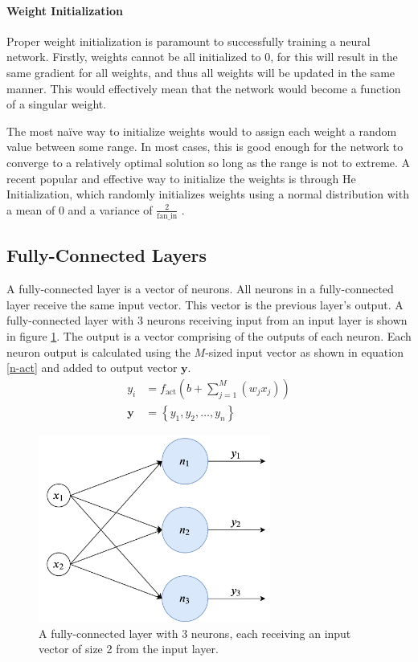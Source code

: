 \paragraph{Weight Initialization}
Proper weight initialization is paramount to successfully training a neural network. Firstly, weights cannot be all initialized to 0, for this will result in the same gradient for all weights, and thus all weights will be updated in the same manner. This would effectively mean that the network would become a function of a singular weight.

The most na\"ive way to initialize weights would to assign each weight a random value between some range. In most cases, this is good enough for the network to converge to a relatively optimal solution so long as the range is not to extreme. A recent popular and effective way to initialize the weights is through He Initialization, which randomly initializes weights using a normal distribution with a mean of 0 and a variance of $\frac{2}{\text{fan\_in}}$ \cite{HeZR015}. 


\subsection{Fully-Connected Layers}
A fully-connected layer is a vector of neurons. All neurons in a fully-connected layer receive the same input vector. This vector is the previous layer's output. A fully-connected layer with 3 neurons receiving input from an input layer is shown in figure \ref{fully-connected}. The output is a vector comprising of the outputs of each neuron. Each neuron output is calculated using the $M$-sized input vector as shown in equation \ref{n-act} and added to output vector $\mathbf{y}$.
\begin{align}
y_i &= f_{\text{act}}\left( b + \sum_{j=1}^{M}(w_jx_j) \right) \label{n-act} \\
\mathbf{y} &= \left\{ y_1, y_2, \ldots, y_n \right\} 
\end{align}

\begin{figure}
	\centering
	\includegraphics[width=3in]{figures/fully-connected}
	\caption{A fully-connected layer with 3 neurons, each receiving an input vector of size 2 from the input layer.}\label{fully-connected}
\end{figure}


